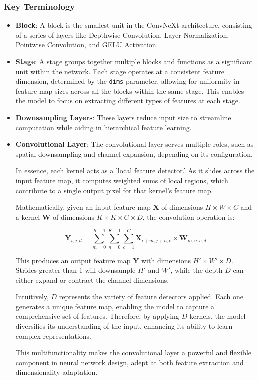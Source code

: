 \documentclass[a4paper,12pt,openright]{book}
\begin{document}
\subsubsection{Key Terminology}
\begin{itemize}
    \item \textbf{Block}: A block is the smallest unit in the ConvNeXt architecture, consisting of a series of layers like Depthwise Convolution, Layer Normalization, Pointwise Convolution, and GELU Activation.
    \item \textbf{Stage}: A stage groups together multiple blocks and functions as a significant unit within the network. Each stage operates at a consistent feature dimension, determined by the \texttt{dims} parameter, allowing for uniformity in feature map sizes across all the blocks within the same stage. This enables the model to focus on extracting different types of features at each stage.
    \item \textbf{Downsampling Layers}: These layers reduce input size to streamline computation while aiding in hierarchical feature learning.
   \item \textbf{Convolutional Layer}:
The convolutional layer serves multiple roles, such as spatial downsampling and channel expansion, depending on its configuration. 

In essence, each kernel acts as a 'local feature detector.' As it slides across the input feature map, it computes weighted sums of local regions, which contribute to a single output pixel for that kernel's feature map.

Mathematically, given an input feature map \( \mathbf{X} \) of dimensions \( H \times W \times C \) and a kernel \( \mathbf{W} \) of dimensions \( K \times K \times C \times D \), the convolution operation is:

\[
\mathbf{Y}_{i,j,d} = \sum_{m=0}^{K-1} \sum_{n=0}^{K-1} \sum_{c=1}^{C} \mathbf{X}_{i+m,j+n,c} \times \mathbf{W}_{m,n,c,d}
\]

This produces an output feature map \( \mathbf{Y} \) with dimensions \( H' \times W' \times D \). Strides greater than 1 will downsample \( H' \) and \( W' \), while the depth \( D \) can either expand or contract the channel dimensions.

Intuitively, \( D \) represents the variety of feature detectors applied. Each one generates a unique feature map, enabling the model to capture a comprehensive set of features. Therefore, by applying \( D \) kernels, the model diversifies its understanding of the input, enhancing its ability to learn complex representations.

This multifunctionality makes the convolutional layer a powerful and flexible component in neural network design, adept at both feature extraction and dimensionality adaptation.

\end{itemize}
\end{document}
